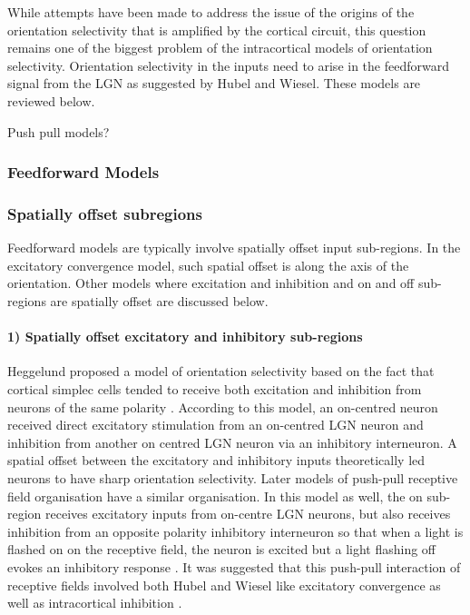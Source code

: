 While attempts have been made to address the issue of the origins of the orientation selectivity that is amplified by the cortical circuit, this question remains one of the biggest problem of the intracortical models of orientation selectivity. Orientation selectivity in the inputs need to arise in the feedforward signal from the LGN as suggested by Hubel and Wiesel. These models are reviewed below. 

Push pull models?

\subsubsection{Feedforward Models}

\subsubsection{Spatially offset subregions}

Feedforward models are typically involve spatially offset input sub-regions. In the excitatory convergence model, such spatial offset is along the axis of the orientation. Other models where excitation and inhibition and on and off sub-regions are spatially offset are discussed below.

\paragraph{1) Spatially offset excitatory and inhibitory sub-regions}

Heggelund proposed a model of orientation selectivity based on the fact that cortical simplec cells tended to receive both excitation and inhibition from neurons of the same polarity \cite{Heggelund1981}. According to this model, an on-centred neuron received direct excitatory stimulation from an on-centred LGN neuron and inhibition from another on centred LGN neuron via an inhibitory interneuron. A spatial offset between the excitatory and inhibitory inputs theoretically led neurons to have sharp orientation selectivity. Later models of push-pull receptive field organisation have a similar organisation. In this model as well, the on sub-region receives excitatory inputs from on-centre LGN neurons, but also receives inhibition from an opposite polarity inhibitory interneuron so that when a light is flashed on on the receptive field, the neuron is excited but a light flashing off evokes an inhibitory response \cite{Palmer1981, Martinez2005, Kremkow2016}. It was suggested that this push-pull interaction of receptive fields involved both Hubel and Wiesel like excitatory convergence as well as intracortical inhibition \cite{Martinez2005}.

